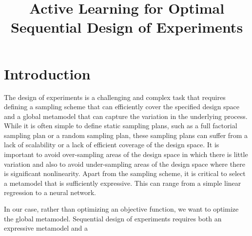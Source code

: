 \documentclass[conference]{IEEEtran}
\begin{document}
	
	
	\title{\LARGE \textbf{Active Learning for Optimal Sequential Design of Experiments}
	}
	
	
	\author{
		} %
	
	
	\maketitle
	
	\begin{abstract}
		
	\end{abstract}
	
	
	\section{Introduction}
	\label{sec:introduction}
	
	
	The design of experiments is a challenging and complex task that requires defining a sampling scheme that can efficiently cover the specified design space and a global metamodel that can capture the variation in the underlying process. While it is often simple to define static sampling plans, such as a full factorial sampling plan or a random sampling plan, these sampling plans can suffer from a lack of scalability or a lack of efficient coverage of the design space. It is important to avoid over-sampling areas of the design space in which there is little variation and also to avoid under-sampling areas of the design space where there is significant nonlinearity. Apart from the sampling scheme, it is critical to select a metamodel that is sufficiently expressive. This can range from a simple linear regression to a neural network.
	
	In our case, rather than optimizing an objective function, we want to optimize the global metamodel.
	Sequential design of experiments requires both an expressive metamodel and a
	
\end{document}
